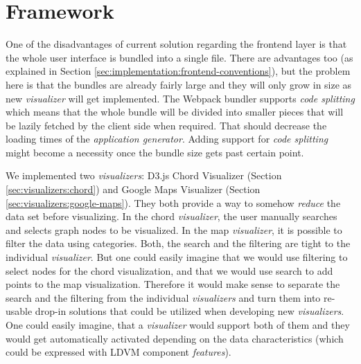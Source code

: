 \section{Framework}

One of the disadvantages of current solution regarding the frontend layer is that the whole user interface is bundled into a single file. There are advantages too (as explained in Section \ref{sec:implementation:frontend-conventions}), but the problem here is that the bundles are already fairly large and they will only grow in size as new \emph{visualizer} will get implemented. The Webpack bundler supports \emph{code splitting} which means that the whole bundle will be divided into smaller pieces that will be lazily fetched by the client side when required. That should decrease the loading times of the \emph{application generator}. Adding support for \emph{code splitting} might become a necessity once the bundle size gets past certain point.

We implemented two \emph{visualizers}: D3.js Chord Visualizer (Section \ref{sec:visualizers:chord}) and Google Maps Visualizer (Section \ref{sec:visualizers:google-maps}). They both provide a way to somehow \emph{reduce} the data set before visualizing. In the chord \emph{visualizer}, the user manually searches and selects graph nodes to be visualized. In the map \emph{visualizer}, it is possible to filter the data using categories. Both, the search and the filtering are tight to the individual \emph{visualizer}. But one could easily imagine that we would use filtering to select nodes for the chord visualization, and that we would use search to add points to the map visualization. Therefore it would make sense to separate the search and the filtering from the individual \emph{visualizers} and turn them into re-usable drop-in solutions that could be utilized when developing new \emph{visualizers}. One could easily imagine, that a \emph{visualizer} would support both of them and they would get automatically activated depending on the data characteristics (which could be expressed with LDVM component \emph{features}).

